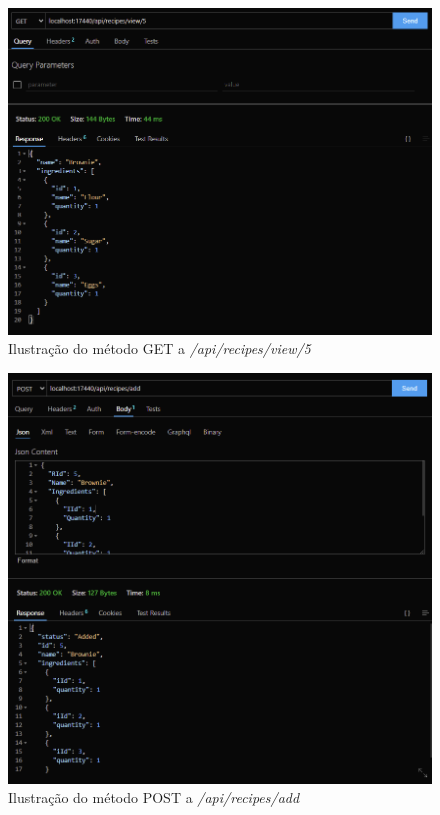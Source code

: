 \begin{figure}[!hbt]
    \centering
    \includegraphics[width=14cm]{Resources/API/Recipes/Recipes (1).png}
    \caption{Ilustração do método GET a \textit{/api/recipes/view/5}}
    
\end{figure}
\FloatBarrier
\begin{figure}[!hbt]
    \centering
    \includegraphics[width=14cm]{Resources/API/Recipes/Recipes (2).png}
    \caption{Ilustração do método POST a \textit{/api/recipes/add}}
    
\end{figure}
